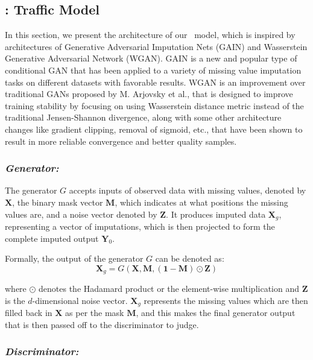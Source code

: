 \subsection{\name: Traffic Model}

In this section, we present the architecture of our \name\ model, which is inspired by architectures of Generative Adversarial Imputation Nets (GAIN)\cite{gain} and Wasserstein Generative Adversarial Network (WGAN)\cite{wgan}. GAIN is a new and popular type of conditional GAN that has been applied to a variety of missing value imputation tasks on different datasets with favorable results. WGAN is an improvement over traditional GANs proposed by M. Arjovsky et al., that is designed to improve training stability by focusing on using Wasserstein distance metric instead of the traditional Jensen-Shannon divergence, along with some other architecture changes like gradient clipping, removal of sigmoid, etc., that have been shown to result in more reliable convergence and better quality samples.

\subsubsection{\textit{Generator:}}

The generator \( G \) accepts inputs of observed data with missing values, denoted by \( \mathbf{X} \), the binary mask vector \( \mathbf{M} \), which indicates at what positions the missing values are, and a noise vector denoted by \( \mathbf{Z} \). It produces imputed data \( \mathbf{X}_g \), representing a vector of imputations, which is then projected to form the complete imputed output \( \mathbf{Y}_0 \). 

Formally, the output of the generator \( G \) can be denoted as: 
\[ \mathbf{X}_g = G(\mathbf{X}, \mathbf{M}, (\mathbf{1}-\mathbf{M}) \odot \mathbf{Z}) \]

where \( \odot \) denotes the Hadamard product or the element-wise multiplication and \( \mathbf{Z} \) is the \( d \)-dimensional noise vector. \( \mathbf{X}_g \) represents the missing values which are then filled back in \( \mathbf{X} \) as per the mask \( \mathbf{M} \), and this makes the final generator output that is then passed off to the discriminator to judge.

\subsubsection{\textit{Discriminator:}}

